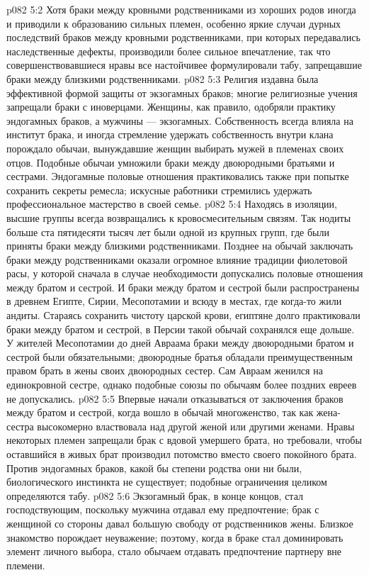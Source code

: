 \vs p082 5:2 Хотя браки между кровными родственниками из хороших родов иногда и приводили к образованию сильных племен, особенно яркие случаи дурных последствий браков между кровными родственниками, при которых передавались наследственные дефекты, производили более сильное впечатление, так что совершенствовавшиеся нравы все настойчивее формулировали табу, запрещавшие браки между близкими родственниками.
\vs p082 5:3 \pc Религия издавна была эффективной формой защиты от экзогамных браков; многие религиозные учения запрещали браки с иноверцами. Женщины, как правило, одобряли практику эндогамных браков, а мужчины --- экзогамных. Собственность всегда влияла на институт брака, и иногда стремление удержать собственность внутри клана порождало обычаи, вынуждавшие женщин выбирать мужей в племенах своих отцов. Подобные обычаи умножили браки между двоюродными братьями и сестрами. Эндогамные половые отношения практиковались также при попытке сохранить секреты ремесла; искусные работники стремились удержать профессиональное мастерство в своей семье.
\vs p082 5:4 \pc Находясь в изоляции, высшие группы всегда возвращались к кровосмесительным связям. Так нодиты больше ста пятидесяти тысяч лет были одной из крупных групп, где были приняты браки между близкими родственниками. Позднее на обычай заключать браки между родственниками оказали огромное влияние традиции фиолетовой расы, у которой сначала в случае необходимости допускались половые отношения между братом и сестрой. И браки между братом и сестрой были распространены в древнем Египте, Сирии, Месопотамии и всюду в местах, где когда\hyp{}то жили андиты. Стараясь сохранить чистоту царской крови, египтяне долго практиковали браки между братом и сестрой, в Персии такой обычай сохранялся еще дольше. У жителей Месопотамии до дней Авраама браки между двоюродными братом и сестрой были обязательными; двоюродные братья обладали преимущественным правом брать в жены своих двоюродных сестер. Сам Авраам женился на единокровной сестре, однако подобные союзы по обычаям более поздних евреев не допускались.
\vs p082 5:5 Впервые начали отказываться от заключения браков между братом и сестрой, когда вошло в обычай многоженство, так как жена\hyp{}сестра высокомерно властвовала над другой женой или другими женами. Нравы некоторых племен запрещали брак с вдовой умершего брата, но требовали, чтобы оставшийся в живых брат производил потомство вместо своего покойного брата. Против эндогамных браков, какой бы степени родства они ни были, биологического инстинкта не существует; подобные ограничения целиком определяются табу.
\vs p082 5:6 \pc Экзогамный брак, в конце концов, стал господствующим, поскольку мужчина отдавал ему предпочтение; брак с женщиной со стороны давал большую свободу от родственников жены. Близкое знакомство порождает неуважение; поэтому, когда в браке стал доминировать элемент личного выбора, стало обычаем отдавать предпочтение партнеру вне племени.
